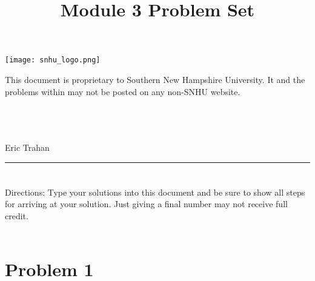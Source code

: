 \documentclass{amsart}
\theoremstyle{definition}
\theoremstyle{Exercise}
\theoremstyle{remark}
\theoremstyle{rule}
\numberwithin{equation}{section}
\begin{document}
\begin{center}
\texttt{[image: snhu\_logo.png]}
\end{center}
\title{\sf Module 3 Problem Set}%


\maketitle
This document is proprietary to Southern New Hampshire University. It and the problems within may not be posted on any non-SNHU website.\\\\\\\\
\begin{center}
Eric Trahan
\end{center}


\begin{center}
\rule{\textwidth}{0.4pt}
\end{center}


\newpage
\section*{}
\section*{}
Directions: Type your solutions into this document and be sure to show all steps for arriving at your solution. Just giving a final number may not receive full credit.
\\\\




\section*{Problem 1}
\end{document}
